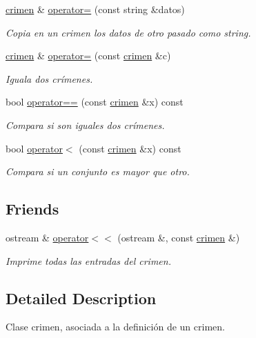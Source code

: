 \begin{DoxyCompactItemize}
\hyperlink{classcrimen}{crimen} \& \hyperlink{classcrimen_aaf1e77874a28ab1f2f5cd61efe386917}{operator=} (const string \&datos)
\begin{DoxyCompactList}\small\item\em Copia en un crimen los datos de otro pasado como string. \end{DoxyCompactList}\item 
\hyperlink{classcrimen}{crimen} \& \hyperlink{classcrimen_a612c4d3beaabd588703e4a580caf04e5}{operator=} (const \hyperlink{classcrimen}{crimen} \&c)
\begin{DoxyCompactList}\small\item\em Iguala dos crímenes. \end{DoxyCompactList}\item 
bool \hyperlink{classcrimen_aeced9ce4b7486123412975b8884d1ab7}{operator==} (const \hyperlink{classcrimen}{crimen} \&x) const 
\begin{DoxyCompactList}\small\item\em Compara si son iguales dos crímenes. \end{DoxyCompactList}\item 
bool \hyperlink{classcrimen_ac865fdb9712f2426d947b1b5546b50e5}{operator$<$} (const \hyperlink{classcrimen}{crimen} \&x) const 
\begin{DoxyCompactList}\small\item\em Compara si un conjunto es mayor que otro. \end{DoxyCompactList}\end{DoxyCompactItemize}
\subsection*{Friends}
\begin{DoxyCompactItemize}
\item 
ostream \& \hyperlink{classcrimen_a70d7dbf132d06cb3c889042765a7da2e}{operator$<$$<$} (ostream \&, const \hyperlink{classcrimen}{crimen} \&)
\begin{DoxyCompactList}\small\item\em Imprime todas las entradas del crimen. \end{DoxyCompactList}\end{DoxyCompactItemize}


\subsection{Detailed Description}
Clase crimen, asociada a la definición de un crimen. 

